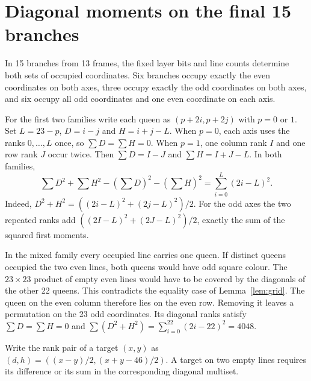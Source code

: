 \documentclass[11pt]{article}
\begin{document}
\section{Diagonal moments on the final 15 branches}\label{sec:terminal}
In 15 branches from 13 frames, the fixed layer bits and line counts
determine both sets of occupied coordinates. Six branches occupy exactly
the even coordinates on both axes, three occupy exactly the odd coordinates
on both axes, and six occupy all odd coordinates and one even coordinate
on each axis.

For the first two families write each queen as $(p+2i,p+2j)$ with
$p=0$ or $1$. Set $L=23-p$, $D=i-j$ and $H=i+j-L$.
When $p=0$, each axis uses the ranks $0,\ldots,L$ once, so
$\sum D=\sum H=0$. When $p=1$, one column rank $I$ and one row rank
$J$ occur twice. Then $\sum D=I-J$ and $\sum H=I+J-L$.
In both families,
\[
 \sum D^2+\sum H^2-(\sum D)^2-(\sum H)^2
 =\sum_{i=0}^L(2i-L)^2 .
\]
Indeed, $D^2+H^2=((2i-L)^2+(2j-L)^2)/2$. For the odd axes the two
repeated ranks add $((2I-L)^2+(2J-L)^2)/2$, exactly the sum of the
squared first moments.

In the mixed family every occupied line carries one queen. If distinct
queens occupied the two even lines, both queens would have odd square
colour. The $23\times23$ product of empty even lines would have to be
covered by the diagonals of the other 22 queens. This contradicts the
equality case of Lemma~\ref{lem:grid}. The queen on the even column
therefore lies on the even row. Removing it leaves a permutation on the
23 odd coordinates. Its diagonal ranks satisfy $\sum D=\sum H=0$ and
$\sum(D^2+H^2)=\sum_{i=0}^{22}(2i-22)^2=4048$.

Write the rank pair of a target $(x,y)$ as
$(d,h)=((x-y)/2,(x+y-46)/2)$. A target on two empty lines
requires its difference or its sum in the corresponding diagonal multiset.
\end{document}
